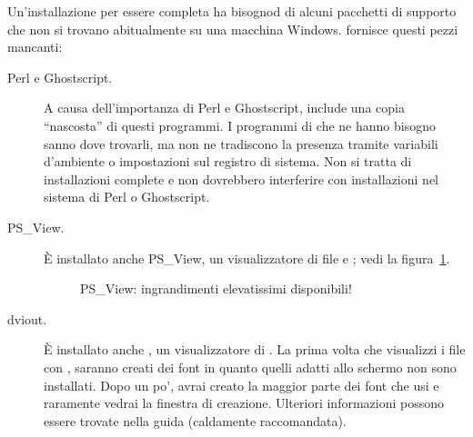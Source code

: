 \documentclass{article}
\begin{document}
Un'installazione \TL{} per essere completa ha bisognod di alcuni pacchetti
di supporto che non si trovano abitualmente su una macchina Windows. \TL{}
fornisce questi pezzi mancanti:
\begin{description}
\item[Perl e Ghostscript.] A causa dell'importanza di Perl e Ghostscript,
  \TL{} include una copia ``nascosta'' di questi programmi. I programmi di
  \TL{} che ne hanno bisogno sanno dove trovarli, ma non ne tradiscono la
  presenza tramite variabili d'ambiente o impostazioni sul registro di
  sistema. Non si tratta di installazioni complete e non dovrebbero
  interferire con installazioni nel sistema di Perl o Ghostscript.

\item[PS\_View.] È installato anche PS\_View, un visualizzatore di file
  \PS{} e ; vedi la figura~\ref{fig:psview}.

\begin{figure}[tb]
\caption{PS\_View: ingrandimenti elevatissimi disponibili!}
\label{fig:psview}
\end{figure}

\item[dviout.] È installato anche , un visualizzatore di
  . La prima volta che visualizzi i file con ,
  saranno creati dei font in quanto quelli adatti allo schermo non sono
  installati. Dopo un po', avrai creato la maggior parte dei font che usi
  e raramente vedrai la finestra di creazione. Ulteriori informazioni
  possono essere trovate nella guida (caldamente raccomandata).


\end{description}
\end{document}
